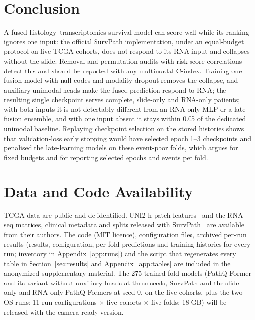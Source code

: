 \documentclass{article}
\newcommand{\pq}{PathQ-Former}
\newcommand{\cindex}{C-index}
\begin{document}
\section{Conclusion}
\label{sec:conclusion}
A fused histology--transcriptomics survival model can score well while its ranking ignores one input: the official SurvPath implementation, under an equal-budget protocol on five TCGA cohorts, does not respond to its RNA input and collapses without the slide. Removal and permutation audits with risk-score correlations detect this and should be reported with any multimodal \cindex{}. Training one fusion model with null codes and modality dropout removes the collapse, and auxiliary unimodal heads make the fused prediction respond to RNA; the resulting single checkpoint serves complete, slide-only and RNA-only patients; with both inputs it is not detectably different from an RNA-only MLP or a late-fusion ensemble, and with one input absent it stays within 0.05 of the dedicated unimodal baseline. Replaying checkpoint selection on the stored histories shows that validation-loss early stopping would have selected epoch 1--3 checkpoints and penalised the late-learning models on these event-poor folds, which argues for fixed budgets and for reporting selected epochs and events per fold.

\section*{Data and Code Availability}
TCGA data are public and de-identified. UNI2-h patch features~\citep{uni2h,uni2hfeatures} and the RNA-seq matrices, clinical metadata and splits released with SurvPath~\citep{jaume2024survpath} are available from their authors. The code (MIT licence), configuration files, archived per-run results (results, configuration, per-fold predictions and training histories for every run; inventory in Appendix~\ref{app:runs}) and the script that regenerates every table in Section~\ref{sec:results} and Appendix~\ref{app:tables} are included in the anonymized supplementary material. The 275 trained fold models (\pq{} and its variant without auxiliary heads at three seeds, SurvPath and the slide-only and RNA-only \pq{}s at seed 0, on the five cohorts, plus the two OS runs: 11 run configurations $\times$ five cohorts $\times$ five folds; 18 GB) will be released with the camera-ready version.
\end{document}
